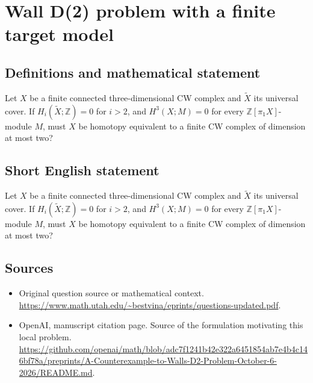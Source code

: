 \documentclass[11pt]{article}
\begin{document}
\section*{Wall D(2) problem with a finite target model}\label{statement}
\subsection{Definitions and mathematical statement}
Let $X$ be a finite connected three-dimensional CW complex and $\widetilde X$ its universal cover. If $H_i(\widetilde X;\mathbb Z)=0$ for $i>2$, and $H^3(X;M)=0$ for every $\mathbb Z[\pi_1X]$-module $M$, must $X$ be homotopy equivalent to a finite CW complex of dimension at most two?
\subsection{Short English statement}
Let $X$ be a finite connected three-dimensional CW complex and $\widetilde X$ its universal cover. If $H_i(\widetilde X;\mathbb Z)=0$ for $i>2$, and $H^3(X;M)=0$ for every $\mathbb Z[\pi_1X]$-module $M$, must $X$ be homotopy equivalent to a finite CW complex of dimension at most two?
\subsection{Sources}
\begin{itemize}
\item[S1] Original question source or mathematical context.
\url{https://www.math.utah.edu/~bestvina/eprints/questions-updated.pdf}.
\item[S2] OpenAI, manuscript citation page. Source of the formulation motivating this local problem.
\url{https://github.com/openai/math/blob/adc7f1241b42e322a6451854ab7e4b4c146bf78a/preprints/A-Counterexample-to-Walls-D2-Problem-October-6-2026/README.md}.
\end{itemize}
\end{document}
